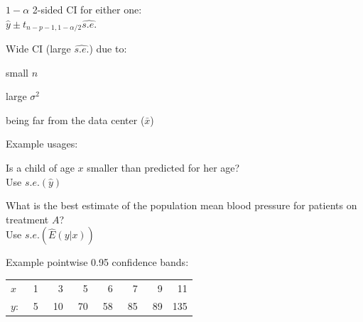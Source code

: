  \ei
\item $1-\alpha$ 2-sided CI for either one: \\
  $\hat{y} \pm t_{n-p-1,1-\alpha/2}\widehat{s.e.}$
\item Wide CI (large $\widehat{s.e.}$) due to:
  \bi
  \item small $n$
  \item large $\sigma^2$
  \item being far from the data center ($\bar{x}$)
  \ei
\item Example usages:
  \bi
  \item Is a child of age $x$ smaller than predicted for her age? \\
    Use $s.e.(\hat{y})$
  \item What is the best estimate of the population mean blood pressure for
    patients on treatment $A$? \\
    Use $s.e.(\hat{E}(y|x))$
  \ei
\item Example pointwise 0.95 confidence bands:\ipacue \\
  \begin{tabular}{lccccccc}
  $x$ & ~1 & ~~3 & ~~5 & ~~6 & ~~7 & ~~9 & ~11 \\
  $y$:& ~5 & ~10 & ~70 & ~58 & ~85 & ~89 & 135
  \end{tabular}
